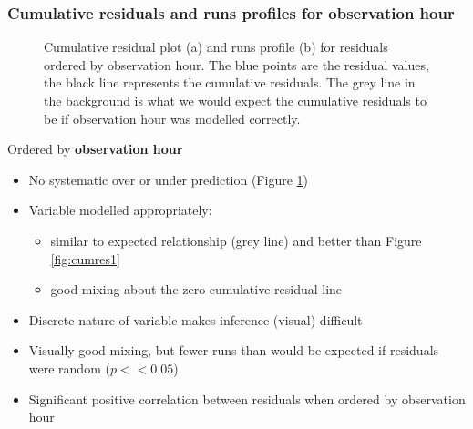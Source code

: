 \documentclass[11pt, a4paper]{article}
\begin{document}
\begin{frame}[fragile]
\frametitle{Cumulative residuals and runs profiles for observation hour}
\begin{figure}[h]
  \centering
{}
    \caption{Cumulative residual plot (a) and runs profile (b) for residuals ordered by observation hour. The blue points are the residual values, the black line represents the cumulative residuals. The grey line in the background is what we would expect the cumulative residuals to be if observation hour was modelled correctly.}
  \label{fig:geeruns1}
\end{figure}
\end{frame}

\begin{frame}[fragile]
Ordered by \textbf{observation hour}
\begin{itemize}
\item No systematic over or under prediction (Figure \ref{fig:geeruns1})
\item Variable modelled appropriately:
\begin{itemize}
  \item similar to expected relationship (grey line) and better than Figure \ref{fig:cumres1}
  \item good mixing about the zero cumulative residual line
\end{itemize}
\item Discrete nature of variable makes inference (visual) difficult
\item Visually good mixing, but fewer runs than would be expected if residuals were random ($p<<0.05$)
\item Significant positive correlation between residuals when ordered by observation hour
\end{itemize}
\end{frame}
\end{document}
